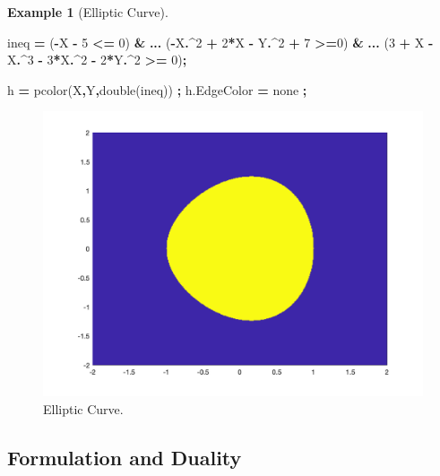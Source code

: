 \documentclass[
]{book}
\newenvironment{Shaded}{\begin{snugshade}}{\end{snugshade}}
\newcommand{\FloatTok}[1]{\textcolor[rgb]{0.00,0.00,0.81}{#1}}
\newcommand{\NormalTok}[1]{#1}
\newcommand{\OperatorTok}[1]{\textcolor[rgb]{0.81,0.36,0.00}{\textbf{#1}}}
\newcommand{\SpecialStringTok}[1]{\textcolor[rgb]{0.31,0.60,0.02}{#1}}
\newcommand{\VariableTok}[1]{\textcolor[rgb]{0.00,0.00,0.00}{#1}}
\theoremstyle{definition}
\theoremstyle{definition}
\newtheorem{example}{Example}[chapter]
\theoremstyle{definition}
\theoremstyle{definition}
\theoremstyle{remark}
\begin{document}
\begin{example}[Elliptic Curve]
\begin{Shaded}
\begin{Highlighting}[]
\VariableTok{ineq} \OperatorTok{=}\NormalTok{ (}\OperatorTok{{-}}\VariableTok{X} \OperatorTok{{-}} \FloatTok{5} \OperatorTok{\textless{}=} \FloatTok{0}\NormalTok{) }\OperatorTok{\&} \OperatorTok{...}
\NormalTok{    (}\OperatorTok{{-}}\VariableTok{X}\OperatorTok{.\^{}}\FloatTok{2} \OperatorTok{+} \FloatTok{2}\OperatorTok{*}\VariableTok{X} \OperatorTok{{-}} \VariableTok{Y}\OperatorTok{.\^{}}\FloatTok{2} \OperatorTok{+} \FloatTok{7} \OperatorTok{\textgreater{}=}\FloatTok{0}\NormalTok{) }\OperatorTok{\&} \OperatorTok{...}
\NormalTok{    (}\FloatTok{3} \OperatorTok{+} \VariableTok{X} \OperatorTok{{-}} \VariableTok{X}\OperatorTok{.\^{}}\FloatTok{3} \OperatorTok{{-}} \FloatTok{3}\OperatorTok{*}\VariableTok{X}\OperatorTok{.\^{}}\FloatTok{2} \OperatorTok{{-}} \FloatTok{2}\OperatorTok{*}\VariableTok{Y}\OperatorTok{.\^{}}\FloatTok{2} \OperatorTok{\textgreater{}=} \FloatTok{0}\NormalTok{)}\OperatorTok{;}

\VariableTok{h} \OperatorTok{=} \VariableTok{pcolor}\NormalTok{(}\VariableTok{X}\OperatorTok{,}\VariableTok{Y}\OperatorTok{,}\VariableTok{double}\NormalTok{(}\VariableTok{ineq}\NormalTok{)) }\OperatorTok{;}
\VariableTok{h}\NormalTok{.}\VariableTok{EdgeColor} \OperatorTok{=} \SpecialStringTok{\textquotesingle{}none\textquotesingle{}} \OperatorTok{;}
\end{Highlighting}
\end{Shaded}

\begin{figure}

{\centering \includegraphics[width=0.6\linewidth]{images/elliptic_curve} 

}

\caption{Elliptic Curve.}\label{fig:EllipticCurve}
\end{figure}

\end{example}

\hypertarget{formulation-and-duality}{%
\subsection{Formulation and Duality}\label{formulation-and-duality}}
\end{document}
